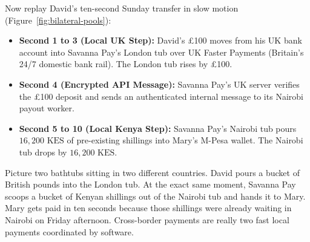 Now replay David's ten-second Sunday transfer in slow motion (Figure~\ref{fig:bilateral-pools}):
\begin{itemize}
  \item \textbf{Second 1 to 3 (Local UK Step):} David's \pounds 100 moves from his UK bank account into Savanna Pay's London tub over UK Faster Payments (Britain's 24/7 domestic bank rail). The London tub rises by \pounds 100.
  \item \textbf{Second 4 (Encrypted API Message):} Savanna Pay's UK server verifies the \pounds 100 deposit and sends an authenticated internal message to its Nairobi payout worker.
  \item \textbf{Second 5 to 10 (Local Kenya Step):} Savanna Pay's Nairobi tub pours $16{,}200\text{ KES}$ of pre-existing shillings into Mary's M-Pesa wallet. The Nairobi tub drops by $16{,}200\text{ KES}$.
\end{itemize}

\begin{happeningbox}
Picture two bathtubs sitting in two different countries. David pours a bucket of British pounds into the London tub. At the exact same moment, Savanna Pay scoops a bucket of Kenyan shillings out of the Nairobi tub and hands it to Mary. Mary gets paid in ten seconds because those shillings were already waiting in Nairobi on Friday afternoon. Cross-border payments are really two fast local payments coordinated by software.
\end{happeningbox}

